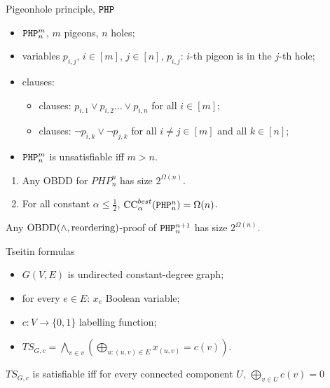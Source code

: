 \begin{frame}{Pigeonhole principle, $\mathtt{PHP}$}
	\begin{itemize}
        \item $\mathtt{PHP}^m_n$, $m$ pigeons, $n$ holes;
        \item variables $p_{i, j}$, $i \in [m]$, $j \in [n]$, $p_{i, j}$: $i$-th pigeon is in the $j$-th
            hole;
        \item clauses:
        	\begin{itemize}
                \item \color{blue}{long} clauses:
                    $p_{i, 1} \lor p_{i, 2} \dots \lor p_{i, n}$ for all $i \in [m]$;
                \item \color{blue}{short} clauses: $\lnot p_{i, k} \lor \lnot p_{j, k}$ for all $i \neq j
                    \in [m]$ and all $k \in [n]$;
            \end{itemize}
        \item $\mathtt{PHP}^m_n$ is unsatisfiable iff $m > n$.
    \end{itemize}

    \pause
    \begin{lemma}
        \begin{enumerate}
            \item Any OBDD for $PHP^n_n$ has size $2^{\Omega(n)}$.
            \item For all constant $\alpha \le \frac{1}{2}$, $\mathrm{CC}^{best}_{\alpha}(\mathtt{PHP}^n_n) = \Omega(n)$.
        \end{enumerate}
    \end{lemma}

    \pause

    \begin{theorem}
        Any $\mathrm{OBDD}(\land, \mathrm{reordering})$-proof of $\mathtt{PHP}^{n+1}_n$ has size $2^{\Omega(n)}$.
    \end{theorem}

\end{frame}


\begin{frame}{Tseitin formulas}
	\begin{itemize}
        \item $G(V, E)$ is undirected constant-degree graph;
        \item for every $e \in E$: $x_e$ Boolean variable;
        \item $c: V \to \{0, 1\}$ labelling function;
        \item $TS_{G, c} = \bigwedge\limits_{v \in v} \left( \bigoplus\limits_{u: (u, v) \in E}
            x_{(u, v)} = c(v) \right)$.
    \end{itemize}

    \begin{theorem}[Folklore]
        $TS_{G, c}$ is satisfiable iff for every connected component $U$, $\bigoplus\limits_{v \in U} c(v) = 0$
    \end{theorem}
\end{frame}


